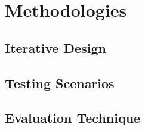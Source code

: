 

\chapter{Methodologies}
\label{cha:methodologies}

\section{Iterative Design}
\label{sec:iterative_design}

\section{Testing Scenarios}
\label{sec:testing_scenarios}

\section{Evaluation Technique}
\label{sec:evaluation_technique}
